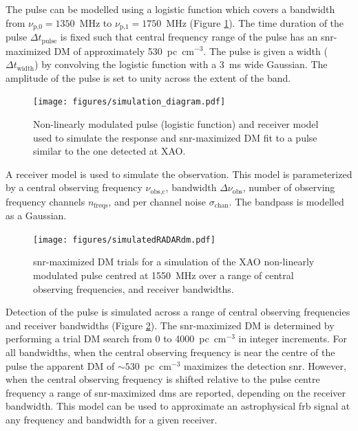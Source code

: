 \documentclass[a4paper,fleqn,usenatbib]{mnras}
\begin{document}
The pulse can be modelled using a logistic function which covers a bandwidth
from $\nu_{\textrm{p,0}} = 1350$~MHz to $\nu_{\textrm{p,1}} = 1750$~MHz (Figure
\ref{fig:xao_simulation_diagram}). The time duration of the pulse $\Delta
t_{\textrm{pulse}}$ is fixed such that central frequency range of the pulse has
an \gls{snr}-maximized DM of approximately 530~pc~cm$^{-3}$. The pulse is given
a width ($\Delta t_{\textrm{width}}$) by convolving the logistic function with a
3~ms wide Gaussian. The amplitude of the pulse is set to unity across the extent
of the band.

\begin{figure}
    \texttt{[image: figures/simulation\_diagram.pdf]}
    \caption{Non-linearly modulated pulse (logistic function) and receiver model
    used to simulate the response and \gls{snr}-maximized DM fit to a pulse
    similar to the one detected at XAO.
    }
    \label{fig:xao_simulation_diagram}
\end{figure}

A receiver model is used to simulate the observation. This model is
parameterized by a central observing frequency $\nu_{\textrm{obs,c}}$, bandwidth
$\Delta \nu_{\textrm{obs}}$, number of observing frequency channels
$n_{\textrm{freqs}}$, and per channel noise $\sigma_{\textrm{chan}}$. The
bandpass is modelled as a Gaussian.

\begin{figure}
    \texttt{[image: figures/simulatedRADARdm.pdf]}
    \caption{\gls{snr}-maximized DM trials for a simulation of the XAO
    non-linearly modulated pulse centred at 1550~MHz over a range of central
    observing frequencies, and receiver bandwidths.
    }
    \label{fig:xao_simulated_dm}
\end{figure}

Detection of the pulse is simulated across a range of central observing
frequencies and receiver bandwidths (Figure \ref{fig:xao_simulated_dm}). The
\gls{snr}-maximized DM is determined by performing a trial DM search from 0 to
4000~pc~cm$^{-3}$ in integer increments.  For all bandwidths, when the central
observing frequency is near the centre of the pulse the apparent DM of
$\sim530$~pc~cm$^{-3}$ maximizes the detection \gls{snr}. However, when the
central observing frequency is shifted relative to the pulse centre frequency a
range of \gls{snr}-maximized \glspl{dm} are reported, depending on the receiver
bandwidth. This model can be used to approximate an astrophysical \gls{frb}
signal at any frequency and bandwidth for a given receiver.
\end{document}
